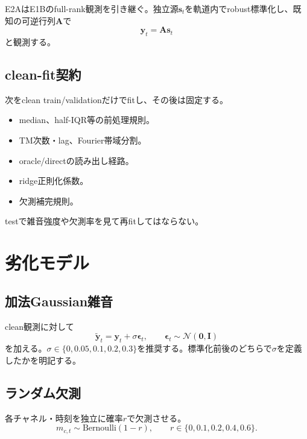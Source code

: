\documentclass[a4paper,11pt,oneside,openany]{ltjsbook}
\newcommand{\vect}[1]{\bm{#1}}
\newcommand{\mat}[1]{\bm{#1}}
\begin{document}
E2AはE1Bのfull-rank観測を引き継ぐ。独立源\(\vect s_t\)を軌道内でrobust標準化し、既知の可逆行列\(\mat A\)で
\begin{equation}
  \vect y_t=\mat A\vect s_t
  \label{eq:e2_clean_observation}
\end{equation}
と観測する。

\subsection{clean-fit契約}

次をclean train/validationだけでfitし、その後は固定する。

\begin{itemize}
  \item median、half-IQR等の前処理規則。
  \item TM次数・lag、Fourier帯域分割。
  \item oracle/directの読み出し経路。
  \item ridge正則化係数。
  \item 欠測補完規則。
\end{itemize}

testで雑音強度や欠測率を見て再fitしてはならない。

\section{劣化モデル}

\subsection{加法Gaussian雑音}

clean観測に対して
\begin{equation}
  \widetilde{\vect y}_t
  =\vect y_t+\sigma\vect\epsilon_t,
  \qquad
  \vect\epsilon_t\sim\mathcal N(\vect0,\mat I)
  \label{eq:e2_gaussian_noise}
\end{equation}
を加える。\(\sigma\in\{0,0.05,0.1,0.2,0.3\}\)を推奨する。標準化前後のどちらで\(\sigma\)を定義したかを明記する。

\subsection{ランダム欠測}

各チャネル・時刻を独立に確率\(r\)で欠測させる。
\begin{equation}
  m_{c,t}\sim\mathrm{Bernoulli}(1-r),
  \qquad r\in\{0,0.1,0.2,0.4,0.6\}.
  \label{eq:e2_missing_mask}
\end{equation}
\end{document}
